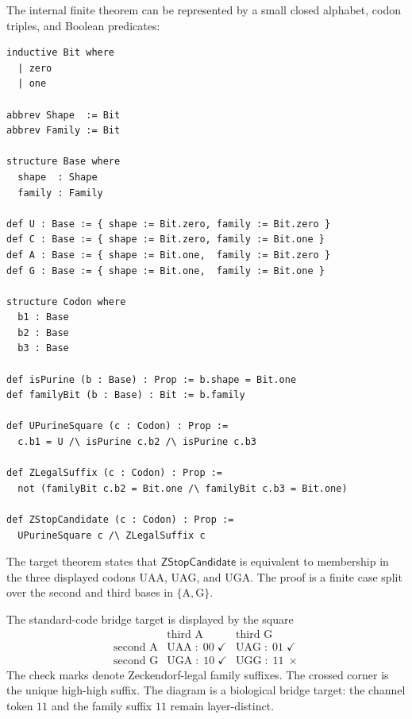 \begin{definition}
\label{def:philosophy-zterm-lean-finite-skeleton}
The internal finite theorem can be represented by a small closed
alphabet, codon triples, and Boolean predicates:
\begin{verbatim}
inductive Bit where
  | zero
  | one

abbrev Shape  := Bit
abbrev Family := Bit

structure Base where
  shape  : Shape
  family : Family

def U : Base := { shape := Bit.zero, family := Bit.zero }
def C : Base := { shape := Bit.zero, family := Bit.one }
def A : Base := { shape := Bit.one,  family := Bit.zero }
def G : Base := { shape := Bit.one,  family := Bit.one }

structure Codon where
  b1 : Base
  b2 : Base
  b3 : Base

def isPurine (b : Base) : Prop := b.shape = Bit.one
def familyBit (b : Base) : Bit := b.family

def UPurineSquare (c : Codon) : Prop :=
  c.b1 = U /\ isPurine c.b2 /\ isPurine c.b3

def ZLegalSuffix (c : Codon) : Prop :=
  not (familyBit c.b2 = Bit.one /\ familyBit c.b3 = Bit.one)

def ZStopCandidate (c : Codon) : Prop :=
  UPurineSquare c /\ ZLegalSuffix c
\end{verbatim}
The target theorem states that $\mathsf{ZStopCandidate}$ is equivalent
to membership in the three displayed codons
$\mathrm{UAA}$, $\mathrm{UAG}$, and $\mathrm{UGA}$. The proof is a
finite case split over the second and third bases in
$\{\mathrm{A},\mathrm{G}\}$.
\end{definition}

\begin{definition}
\label{def:philosophy-stop-square-diagram}
The standard-code bridge target is displayed by the square
$$
\begin{array}{c|cc}
   & \text{third } \mathrm{A} & \text{third } \mathrm{G}\\
\hline
  \text{second } \mathrm{A}
    & \mathrm{UAA}\;:\;00\;\checkmark
    & \mathrm{UAG}\;:\;01\;\checkmark\\
  \text{second } \mathrm{G}
    & \mathrm{UGA}\;:\;10\;\checkmark
    & \mathrm{UGG}\;:\;11\;\times
\end{array}
$$
The check marks denote Zeckendorf-legal family suffixes. The crossed
corner is the unique high-high suffix. The diagram is a biological
bridge target: the channel token $11$ and the family suffix $11$ remain
layer-distinct.
\end{definition}

